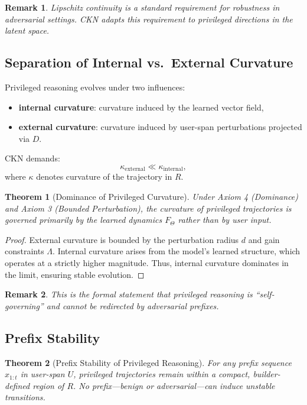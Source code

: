 \documentclass[11pt,a4paper]{article}
\newtheorem{theorem}{Theorem}[section]
\newtheorem*{remark}{Remark}
\begin{document}
\begin{remark}
Lipschitz continuity is a standard requirement for robustness in adversarial settings. CKN adapts this requirement to privileged directions in the latent space.
\end{remark}

\subsection{Separation of Internal vs.\ External Curvature}

Privileged reasoning evolves under two influences:
\begin{itemize}
    \item \textbf{internal curvature}: curvature induced by the learned vector field,
    \item \textbf{external curvature}: curvature induced by user-span perturbations projected via $D$.
\end{itemize}

CKN demands:
\[
\kappa_{\text{external}} \ll \kappa_{\text{internal}},
\]
where $\kappa$ denotes curvature of the trajectory in $R$.

\begin{theorem}[Dominance of Privileged Curvature]
Under Axiom 4 (Dominance) and Axiom 3 (Bounded Perturbation), the curvature of privileged trajectories is governed primarily by the learned dynamics $F_\Theta$ rather than by user input.
\end{theorem}

\begin{proof}
External curvature is bounded by the perturbation radius $d$ and gain constraints $\Lambda$. Internal curvature arises from the model's learned structure, which operates at a strictly higher magnitude. Thus, internal curvature dominates in the limit, ensuring stable evolution.
\end{proof}

\begin{remark}
This is the formal statement that privileged reasoning is ``self-governing'' and cannot be redirected by adversarial prefixes.
\end{remark}

\subsection{Prefix Stability}

\begin{theorem}[Prefix Stability of Privileged Reasoning]
For any prefix sequence $x_{1:t}$ in user-span $U$, privileged trajectories remain within a compact, builder-defined region of $R$. No prefix---benign or adversarial---can induce unstable transitions.
\end{theorem}
\end{document}
